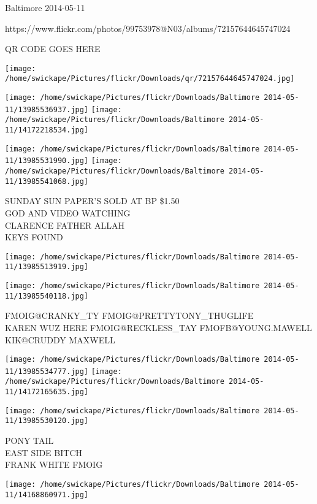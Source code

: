 \documentclass[10pt,letterpaper]{article}
\begin{document}
Baltimore 2014-05-11

https://www.flickr.com/photos/99753978@N03/albums/72157644645747024

QR CODE GOES HERE

\texttt{[image: /home/swickape/Pictures/flickr/Downloads/qr/72157644645747024.jpg]}
\pagebreak

\texttt{[image: /home/swickape/Pictures/flickr/Downloads/Baltimore 2014-05-11/13985536937.jpg]}
\texttt{[image: /home/swickape/Pictures/flickr/Downloads/Baltimore 2014-05-11/14172218534.jpg]}

\texttt{[image: /home/swickape/Pictures/flickr/Downloads/Baltimore 2014-05-11/13985531990.jpg]}
\texttt{[image: /home/swickape/Pictures/flickr/Downloads/Baltimore 2014-05-11/13985541068.jpg]}

SUNDAY SUN PAPER'S SOLD AT BP \$1.50\\
GOD AND VIDEO WATCHING\\
CLARENCE FATHER ALLAH\\
KEYS FOUND\\
\pagebreak

\texttt{[image: /home/swickape/Pictures/flickr/Downloads/Baltimore 2014-05-11/13985513919.jpg]}

\vspace{0.25in}
\texttt{[image: /home/swickape/Pictures/flickr/Downloads/Baltimore 2014-05-11/13985540118.jpg]}

FMOIG@CRANKY\_TY FMOIG@PRETTYTONY\_THUGLIFE\\
KAREN WUZ HERE FMOIG@RECKLESS\_TAY FMOFB@YOUNG.MAWELL KIK@CRUDDY MAXWELL\\
\pagebreak

\texttt{[image: /home/swickape/Pictures/flickr/Downloads/Baltimore 2014-05-11/13985534777.jpg]}
\texttt{[image: /home/swickape/Pictures/flickr/Downloads/Baltimore 2014-05-11/14172165635.jpg]}

\vspace{0.25in}
\texttt{[image: /home/swickape/Pictures/flickr/Downloads/Baltimore 2014-05-11/13985530120.jpg]}

PONY TAIL\\
EAST SIDE BITCH\\
FRANK WHITE FMOIG\\
\pagebreak

\texttt{[image: /home/swickape/Pictures/flickr/Downloads/Baltimore 2014-05-11/14168860971.jpg]}
\end{document}
